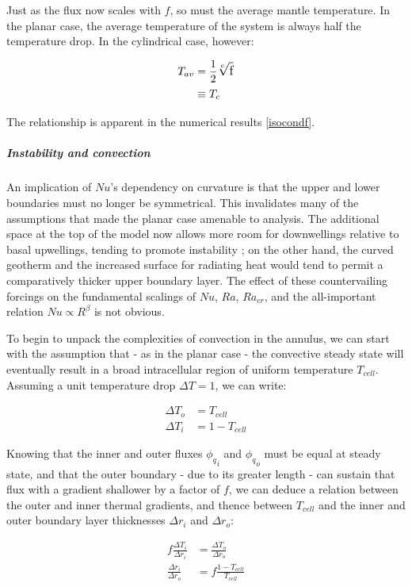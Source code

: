 \documentclass[a4paper,11pt,oneside]{book}
\begin{document}
Just as the flux now scales with $f$, so must the average mantle temperature. In the planar case, the average temperature of the system is always half the temperature drop. In the cylindrical case, however:

\begin{align*}
T_{av} &= \dfrac{1}{2} \large{\sqrt[e]{\text{f}}} \\
&\equiv T_{c}
\end{align*}

The relationship is apparent in the numerical results \ref{isocondf}.

\subparagraph{Instability and convection}

An implication of $Nu$'s dependency on curvature is that the upper and lower boundaries must no longer be symmetrical. This invalidates many of the assumptions that made the planar case amenable to analysis. The additional space at the top of the model now allows more room for downwellings relative to basal upwellings, tending to promote instability \cite{Jarvis1991-ir}; on the other hand, the curved geotherm and the increased surface for radiating heat would tend to permit a comparatively thicker upper boundary layer. The effect of these countervailing forcings on the fundamental scalings of $Nu$, $Ra$, $Ra_{cr}$, and the all-important relation $Nu \propto R^{\beta}$ is not obvious.

To begin to unpack the complexities of convection in the annulus, we can start with the assumption that - as in the planar case - the convective steady state will eventually result in a broad intracellular region of uniform temperature $T_{cell}$. Assuming a unit temperature drop $\Delta T = 1$, we can write:

\begin{align*}
{\Delta T}_o &= T_{cell} \\
{\Delta T}_i &= 1 - T_{cell}
\end{align*}

Knowing that the inner and outer fluxes ${\phi_q}_i$ and ${\phi_q}_o$ must be equal at steady state, and that the outer boundary - due to its greater length - can sustain that flux with a gradient shallower by a factor of $f$, we can deduce a relation between the outer and inner thermal gradients, and thence between $T_{cell}$ and the inner and outer boundary layer thicknesses ${\Delta r}_i$ and ${\Delta r}_o$:

\begin{align*}
f \frac{{\Delta T}_i}{{\Delta r}_i} &= \frac{{\Delta T}_o}{{\Delta r}_o} \\
\frac{{\Delta r}_i}{{\Delta r}_o} &= f \frac{1 - T_{cell}}{T_{cell}}
\end{align*}
\end{document}
